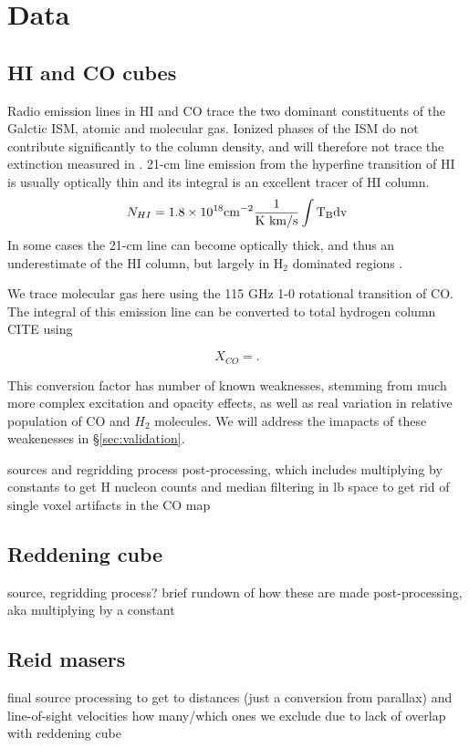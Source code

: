 \section{Data}
\label{sec:data}
\subsection{HI and CO cubes}

Radio emission lines in HI and CO trace the two dominant constituents of the Galctic ISM, atomic and molecular gas. Ionized phases of the ISM do not contribute significantly to the column density, and will therefore not trace the extinction measured in \cite{Green_2015}. 21-cm line emission from the hyperfine transition of HI is usually optically thin and its integral is an excellent tracer of HI column.
\begin{equation}
N_{HI} = 1.8 \times 10^{18} \rm cm^{-2} \frac{1}{\rm K~km/s} \int T_B dv
\end{equation}
In some cases the 21-cm line can become optically thick, and thus an underestimate of the HI column, but largely in H$_2$ dominated regions \cite{Goldsmith_2007}. 

We trace molecular gas here using the 115 GHz 1-0 rotational transition of CO. The integral of this emission line can be converted to total hydrogen column CITE using

\begin{equation}
X_{CO} = .
\end{equation}

This conversion factor has number of known weaknesses, stemming from much more complex excitation and opacity effects, as well as real variation in relative population of CO and $H_2$ molecules. We will address the imapacts of these weakenesses in \S \ref{sec:validation}. 


sources and regridding process
post-processing, which includes multiplying by constants to get H nucleon counts and median filtering in lb space to get rid of single voxel artifacts in the CO map

\subsection{Reddening cube}
source, regridding process?
brief rundown of how these are made
post-processing, aka multiplying by a constant

\subsection{Reid masers}
final source
processing to get to distances (just a conversion from parallax) and line-of-sight velocities
how many/which ones we exclude due to lack of overlap with reddening cube